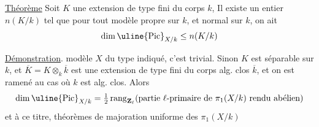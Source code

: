 \uline{Théorème} Soit $K$ une extension de type fini du
corps $k$, 
 Il
existe un entier $n(K/k)$
tel que pour tout modèle  propre sur $k$, et
normal sur $k$,  on ait 
\[
\dim\uline{\mathrm{Pic}}_{X/k}\leq n(K/k)
\]

\uline{Démonstration}. 
modèle $X$ du type indiqué, c'est trivial.
Sinon $K$ est séparable sur $k$, et
$\overline K=K\otimes_k\overline k$ est une extension de type
fini du corps alg. clos $\overline k$, et on
est ramené au cas où $k$ est alg. clos.
Alors
\[
\dim\uline{\mathrm{Pic}}_{X/k}
=\tfrac12\operatorname{rang}_{\mathbf Z_\ell}
(\text{partie $\ell$-primaire de }\pi_1(X/k)\text{ rendu abélien})
\]
et à ce titre,  théorèmes
de majoration uniforme des $\pi_1(X/k)$

